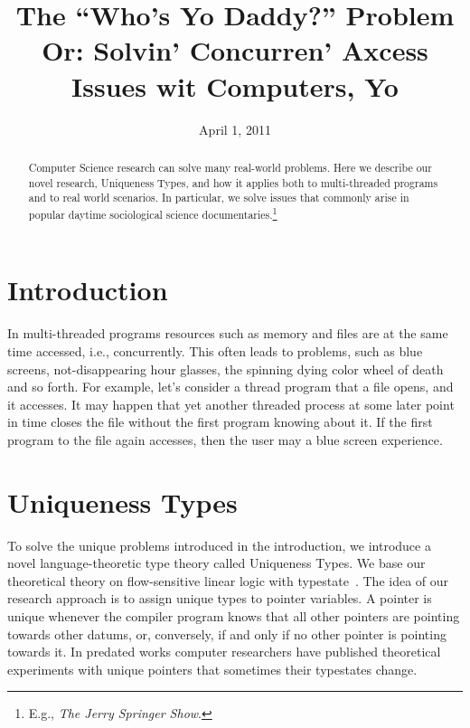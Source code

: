 \documentclass[nocopyrightspace,10pt]{sigplanconf}
\begin{document}
\title{The ``Who's Yo Daddy?'' Problem \\ \Large{Or: Solvin' Concurren' Axcess Issues wit Computers, Yo}}

\date{April 1, 2011}

\maketitle

\pagestyle{empty}
\thispagestyle{empty}

\begin{abstract}
Computer Science research can solve many real-world problems. Here we describe our novel research, Uniqueness Types, and how it applies both to multi-threaded programs and to real world scenarios. In particular, we solve issues that commonly arise in popular daytime sociological science documentaries.\footnote{E.g., \emph{The Jerry Springer Show}.}
\end{abstract}

\section{Introduction}
In multi-threaded programs resources such as memory and files are at the same time accessed, i.e., concurrently. This often leads to problems, such as blue screens, not-disappearing hour glasses, the spinning dying color wheel of death and so forth. For example, let's consider a thread program that a file opens, and it accesses. It may happen that yet another threaded process at some later point in time closes the file without the first program knowing about it. If the first program to the file again accesses, then the user may a blue screen experience.

\section{Uniqueness Types}
To solve the unique problems introduced in the introduction, we introduce a novel language-theoretic type theory called Uniqueness Types. We base our theoretical theory on flow-sensitive linear logic with typestate~\cite{CMUwork}. The idea of our research approach is to assign unique types to pointer variables. A pointer is unique whenever the compiler program knows that all other pointers are pointing towards other datums, or, conversely, if and only if no other pointer is pointing towards it. In predated works computer researchers have published theoretical experiments with unique pointers that sometimes their typestates change.
\end{document}
